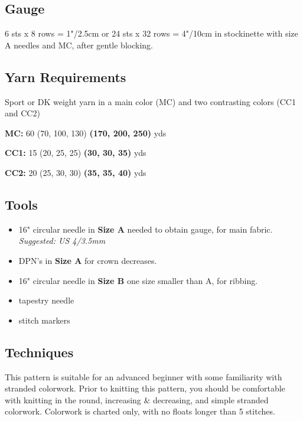 \documentclass[12pt]{article}
\begin{document}
\begin{multicols}{2}
\subsection*{Gauge}

6 sts x 8 rows = 1"/2.5cm or 24 sts x 32 rows = 4"/10cm in stockinette with size A needles and MC, after gentle blocking.

\subsection*{Yarn Requirements}


Sport or DK weight yarn in a main color (MC) and two contrasting colors (CC1 and CC2)

\textbf{MC:} 60 (70, 100, 130) \textbf{(170, 200, 250)} yds

\textbf{CC1:} 15 (20, 25, 25) \textbf{(30, 30, 35)} yds

\textbf{CC2:} 20 (25, 30, 30) \textbf{(35, 35, 40)} yds

\vfill
\columnbreak
\subsection*{Tools}

\begin{itemize} %
\item 16" circular needle in \textbf{Size A} needed to obtain gauge, for main fabric. \emph{Suggested: US 4/3.5mm} 
\item DPN's in \textbf{Size A} for crown decreases.
\item 16" circular needle in \textbf{Size B} one size smaller than A, for ribbing.
\item tapestry needle
\item stitch markers %
\end{itemize}

\subsection*{Techniques}

This pattern is suitable for an advanced beginner with some familiarity with stranded colorwork.
Prior to knitting this pattern, you should be comfortable with knitting in the round, increasing \& decreasing, and simple stranded colorwork. Colorwork is charted only, with no floats longer than 5 stitches. 


\end{multicols}
\end{document}
